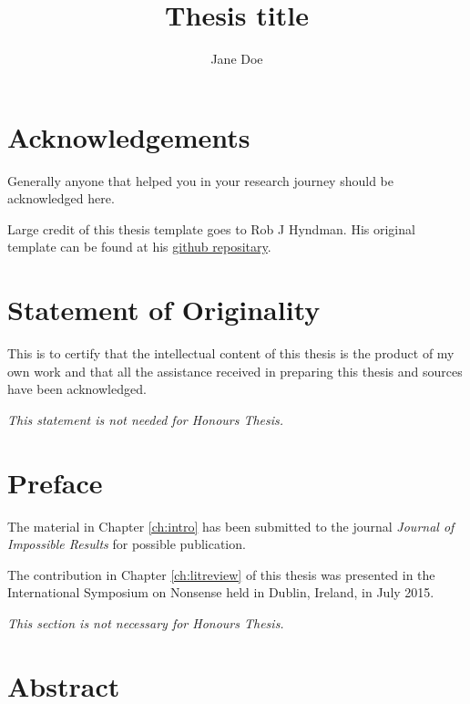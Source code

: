 \documentclass{sydneythesis}
\author{Jane Doe}
\title{Thesis title}
\theoremstyle{definition}
\theoremstyle{definition}
\theoremstyle{definition}
\theoremstyle{remark}
\begin{document}

\titlepage

{\sf\tighttoc\doublespacing}

\chapter*{Acknowledgements}\label{acknowledgements}

Generally anyone that helped you in your research journey should be
acknowledged here.

Large credit of this thesis template goes to Rob J Hyndman. His original
template can be found at his
\href{https://github.com/robjhyndman/MonashThesis}{github repositary}.

\chapter*{Statement of Originality}\label{statement-of-originality}

This is to certify that the intellectual content of this thesis is the
product of my own work and that all the assistance received in preparing
this thesis and sources have been acknowledged.

\emph{This statement is not needed for Honours Thesis.}

\vspace*{2cm}\par\authorname

\chapter*{Preface}\label{preface}

The material in Chapter \ref{ch:intro} has been submitted to the journal
\emph{Journal of Impossible Results} for possible publication.

The contribution in Chapter \ref{ch:litreview} of this thesis was
presented in the International Symposium on Nonsense held in Dublin,
Ireland, in July 2015.

\emph{This section is not necessary for Honours Thesis.}

\chapter*{Abstract}\label{abstract}
\end{document}
